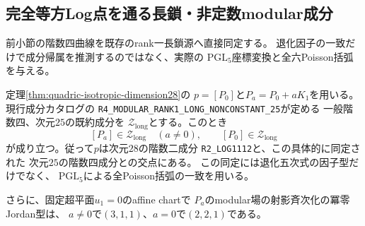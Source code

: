 
\subsection{完全等方Log点を通る長鎖・非定数modular成分}
\label{subsec:isotropic-long-rankfour-membership}

前小節の階数四曲線を既存のrank一長鎖源へ直接同定する。
退化因子の一致だけで成分帰属を推測するのではなく、実際の
\(\mathrm{PGL}_5\)座標変換と全六Poisson括弧を与える。

\begin{theorem}[階数四成分への明示的な帰属]
\label{thm:isotropic-long-rankfour-membership}
定理\ref{thm:quadric-isotropic-dimension28}の
\(p=[P_0]\)と\(P_a=P_0+aK_1\)を用いる。
現行成分カタログの
\texttt{R4\_MODULAR\_RANK1\_LONG\_NONCONSTANT\_25}が定める
一般階数四、次元\(25\)の既約成分を
\(\mathcal Z_{\mathrm{long}}\)とする。このとき
\[
 [P_a]\in\mathcal Z_{\mathrm{long}}\quad(a\ne0),
 \qquad [P_0]\in\mathcal Z_{\mathrm{long}}
\]
が成り立つ。従って\(p\)は次元\(28\)の階数二成分
\texttt{R2\_LOG1112}と、この具体的に同定された
次元\(25\)の階数四成分との交点にある。
この同定には退化五次式の因子型だけでなく、
\(\mathrm{PGL}_5\)による全Poisson括弧の一致を用いる。

さらに、固定超平面\(u_1=0\)のaffine chartで
\(P_a\)のmodular場の射影斉次化の冪零Jordan型は、
\(a\ne0\)で\((3,1,1)\)、\(a=0\)で\((2,2,1)\)である。
\end{theorem}

